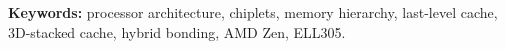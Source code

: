 {\noindent\textbf{Keywords:} processor architecture, chiplets, memory hierarchy, last-level cache, 3D-stacked cache, hybrid bonding, AMD Zen, ELL305.}

\clearpage
\tableofcontents

\clearpage
{}
{}
\listoftables

\clearpage
{}
{}
\listoffigures

\clearpage
\glsaddall
\renewcommand*{\glossarypreamble}{\noindent Definitions follow Sarangi \cite{sarangi2025basic} unless stated otherwise.\par\medskip}
\printglossary[title={Glossary}]
\clearpage
